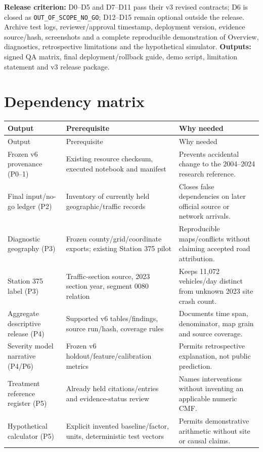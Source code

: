 \documentclass[11pt,a4paper,openany]{report}
\newcommand{\pathcode}[1]{\nolinkurl{#1}}
\begin{document}
\textbf{Release criterion:} D0--D5 and D7--D11 pass their v3 revised contracts; D6 is closed as \pathcode{OUT_OF_SCOPE_NO_GO}; D12--D15 remain optional outside the release. Archive test logs, reviewer/approval timestamp, deployment version, evidence source/hash, screenshots and a complete reproducible demonstration of Overview, diagnostics, retrospective limitations and the hypothetical simulator. \textbf{Outputs:} signed QA matrix, final deployment/rollback guide, demo script, limitation statement and v3 release package.

\section{Dependency matrix}
\small
\begin{longtable}{@{}L{37mm}L{50mm}L{55mm}@{}}\toprule Output & Prerequisite & Why needed\\\midrule\endfirsthead
\toprule Output & Prerequisite & Why needed\\\midrule\endhead
Frozen v6 provenance (P0--1) & Existing resource checksum, executed notebook and manifest & Prevents accidental change to the 2004--2024 research reference.\\
Final input/no-go ledger (P2) & Inventory of currently held geographic/traffic records & Closes false dependencies on later official source or network arrivals.\\
Diagnostic geography (P3) & Frozen county/grid/coordinate exports; existing Station 375 pilot & Reproducible maps/conflicts without claiming accepted road attribution.\\
Station 375 label (P3) & Traffic-section source, 2023 section year, segment 0080 relation & Keeps 11,072 vehicles/day distinct from unknown 2023 site crash count.\\
Aggregate descriptive release (P4) & Supported v6 tables/findings, source run/hash, coverage rules & Documents time span, denominator, map grain and source coverage.\\
Severity model narrative (P4/P6) & Frozen v6 holdout/feature/calibration metrics & Permits retrospective explanation, not public prediction.\\
Treatment reference register (P5) & Already held citations/entries and evidence-status review & Names interventions without inventing an applicable numeric CMF.\\
Hypothetical calculator (P5) & Explicit invented baseline/factor, units, deterministic test vectors & Permits demonstrative arithmetic without site or causal claims.\\

\end{longtable}
\end{document}
